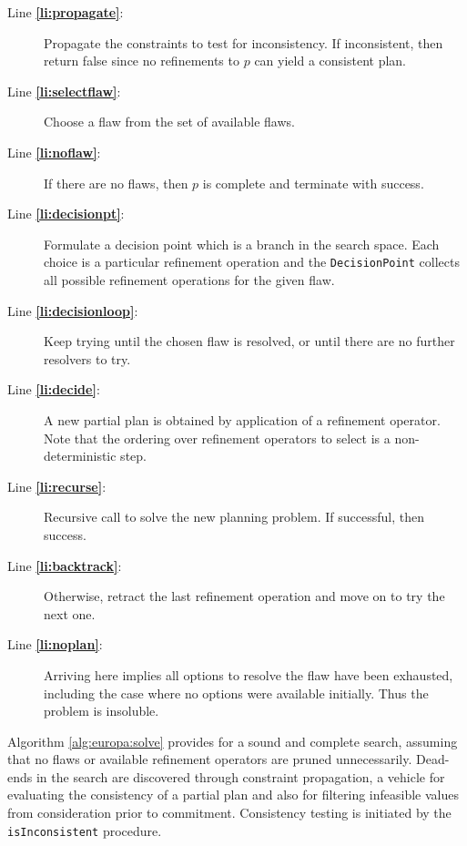 \begin{description}

\item[Line \textbf{\ref{li:propagate}}:] Propagate the constraints to
  test for inconsistency. If inconsistent, then return false since no
  refinements to $p$ can yield a consistent plan.

\item[Line \textbf{\ref{li:selectflaw}}:] Choose a flaw from the set
  of available flaws.

\item[Line \textbf{\ref{li:noflaw}}:] If there are no flaws, then $p$
  is complete and terminate with success.

\item[Line \textbf{\ref{li:decisionpt}}:] Formulate a decision point
  which is a branch in the search space. Each choice is a particular
  refinement operation and the \texttt{DecisionPoint} collects all
  possible refinement operations for the given flaw.

\item[Line \textbf{\ref{li:decisionloop}}:] Keep trying until the
  chosen flaw is resolved, or until there are no further resolvers to
  try.

\item[Line \textbf{\ref{li:decide}}:] A new partial plan is obtained
  by application of a refinement operator. Note that the ordering over
  refinement operators to select is a non-deterministic step.

\item[Line \textbf{\ref{li:recurse}}:] Recursive call to solve the
  new planning problem. If successful, then success.

\item[Line \textbf{\ref{li:backtrack}}:] Otherwise, retract the last
  refinement operation and move on to try the next one.

\item[Line \textbf{\ref{li:noplan}}:] Arriving here implies all
  options to resolve the flaw have been exhausted, including the case
  where no options were available initially. Thus the problem is
  insoluble.

\end{description}

Algorithm \ref{alg:europa:solve} provides for a sound and complete
search, assuming that no flaws or available refinement operators are
pruned unnecessarily.  Dead-ends in the search are discovered through
constraint propagation, a vehicle for evaluating the consistency of a
partial plan and also for filtering infeasible values from
consideration prior to commitment. Consistency testing is initiated by the \texttt{isInconsistent}
procedure. 

